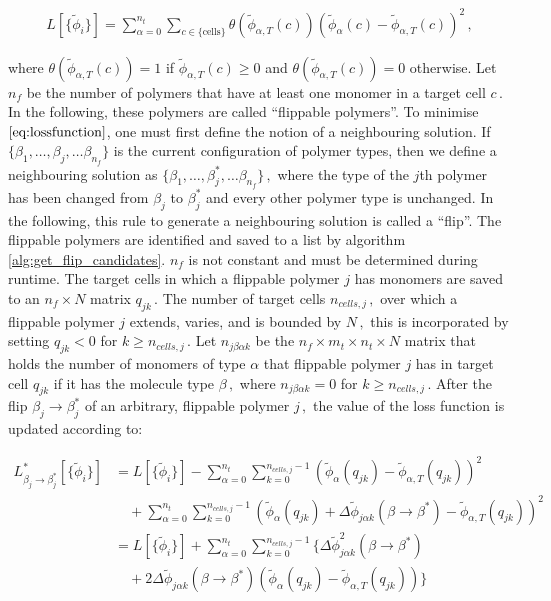 \documentclass[bachelor,       %
               twoside,        %
               BCOR10mm,       %
               ngerman, english %
               ]{GAUBM}
\begin{document}
\begin{align}
    L[\{\tilde\phi_i\}]=\sum_{\alpha=0}^{n_t}\sum_{c\in \{\text{cells}\}}\theta(\tilde{\phi}_{\alpha,T}(c))\left(\tilde{\phi}_\alpha(c)-\tilde{\phi}_{\alpha,T}(c)\right)^2\,,
    \label{eq:lossfunction}
\end{align}

where $\theta(\tilde{\phi}_{\alpha,T}(c))=1$ if $\tilde{\phi}_{\alpha,T}(c)\ge 0$ and $\theta(\tilde{\phi}_{\alpha,T}(c))=0$ otherwise. Let $n_f$ be the number of polymers that have at least one monomer in a target cell $c\,.$ In the following, these polymers are called \enquote{flippable polymers}. To minimise $\eqref{eq:lossfunction}$, one must first define the notion of a neighbouring solution. If $\{\beta_1,\dots,\beta_j,\dots\beta_{n_f}\}$ is the current configuration of polymer types, then we define a neighbouring solution as $\{\beta_1,\dots,\beta^*_j,\dots\beta_{n_f}\}\,,$ where the type of the $j$th polymer has been changed from $\beta_j$ to $\beta_j^*$ and every other polymer type is unchanged. In the following, this rule to generate a neighbouring solution is called a \enquote{flip}. The flippable polymers are identified and saved to a list by algorithm \ref{alg:get_flip_candidates}. $n_f$ is not constant and must be determined during runtime. The target cells in which a flippable polymer $j$ has monomers are saved to an $n_f\times N$ matrix $q_{jk}\,.$ The number of target cells $n_{cells,j}\,,$ over which a flippable polymer $j$ extends, varies, and is bounded by $N\,,$ this is incorporated by setting $q_{jk}<0$ for $k\ge n_{cells,j}\,.$ Let $n_{j\beta\alpha k}$ be the $n_f\times m_t\times n_t\times N$ matrix that holds the number of monomers of type $\alpha$ that flippable polymer $j$ has in target cell $q_{jk}$ if it has the molecule type $\beta\,,$ where $n_{j\beta\alpha k}=0$ for $k\ge n_{cells,j}\,.$ After the flip $\beta_j\rightarrow \beta_j^*$ of an arbitrary, flippable polymer $j\,,$ the value of the loss function is updated according to:

\begin{align}
    L^*_{\beta_j\rightarrow\beta_j^*}[\{\tilde\phi_i\}] &= L[\{\tilde\phi_i\}] 
    - \sum_{\alpha=0}^{n_t}\sum_{k=0}^{n_{cells,j}-1}  \left(\tilde{\phi}_\alpha(q_{jk})-\tilde{\phi}_{\alpha,T}(q_{jk})\right)^2\nonumber \\
    & \quad + \sum_{\alpha=0}^{n_t}\sum_{k=0}^{n_{cells,j}-1}  \left(\tilde{\phi}_\alpha(q_{jk})+\Delta\tilde\phi_{ j\alpha k}(\beta\rightarrow\beta^*)-\tilde{\phi}_{\alpha,T}(q_{jk})\right)^2\nonumber \\
    &= L[\{\tilde\phi_i\}] 
    + \sum_{\alpha=0}^{n_t}\sum_{k=0}^{n_{cells,j}-1}  \biggl\{\Delta\tilde\phi^2_{ j\alpha k}(\beta\rightarrow\beta^*) \nonumber\\
    &\quad + 2\Delta\tilde\phi_{ j\alpha k}(\beta\rightarrow\beta^*)\left(\tilde\phi_{\alpha}(q_{jk})-\tilde\phi_{\alpha,T}(q_{jk})\right)\biggr\}
\end{align}
\end{document}
